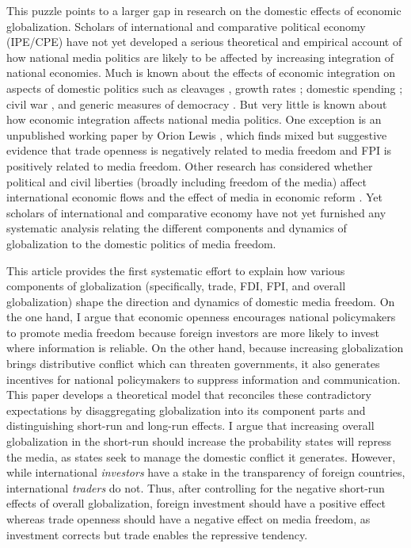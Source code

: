 \documentclass[12pt,a4paper]{article}\usepackage[]{graphicx}\usepackage[]{color}
\begin{document}
This puzzle points to a larger gap in research on the domestic effects of economic globalization. Scholars of international and comparative political economy (IPE/CPE) have not yet developed a serious theoretical and empirical account of how national media politics are likely to be affected by increasing integration of national economies. Much is known about the effects of economic integration on aspects of domestic politics such as cleavages \parencites{Rogowski:1987ip}{Rogowski:1989wm}{Hiscox:2002us}{hiscox2002international}, growth rates \parencite{Rodriguez:2001uw}; domestic spending \parencites{Rodrik:1998te}{Burgoon:2001dp}; civil war \parencites{Barbieri:2005uk}{Bussmann:2007vx}, and generic measures of democracy \parencites{EICHENGREEN:2008gg}{Li:2003vj}. But very little is known about how economic integration affects national media politics. One exception is an unpublished working paper by Orion Lewis \parencite*{Lewis:qDvYbWlU}, which finds mixed but suggestive evidence that trade openness is negatively related to media freedom and FPI is positively related to media freedom. Other research has considered whether political and civil liberties (broadly including freedom of the media) affect international economic flows \parencite{Adam:2007gn} and the effect of media in economic reform \parencites{Coyne:2004bq}{Islam:2002uc}. Yet scholars of international and comparative economy have not yet furnished any systematic analysis relating the different components and dynamics of globalization to the domestic politics of media freedom.

This article provides the first systematic effort to explain how various components of globalization (specifically, trade, FDI, FPI, and overall globalization) shape the direction and dynamics of domestic media freedom. On the one hand, I argue that economic openness encourages national policymakers to promote media freedom because foreign investors are more likely to invest where information is reliable. On the other hand, because increasing globalization brings distributive conflict which can threaten governments, it also generates incentives for national policymakers to suppress information and communication. This paper develops a theoretical model that reconciles these contradictory expectations by disaggregating globalization into its component parts and distinguishing short-run and long-run effects. I argue that increasing overall globalization in the short-run should increase the probability states will repress the media, as states seek to manage the domestic conflict it generates. However, while international \emph{investors} have a stake in the transparency of foreign countries, international \emph{traders} do not. Thus, after controlling for the negative short-run effects of overall globalization, foreign investment should have a positive effect whereas trade openness should have a negative effect on media freedom, as investment corrects but trade enables the repressive tendency.
\end{document}
